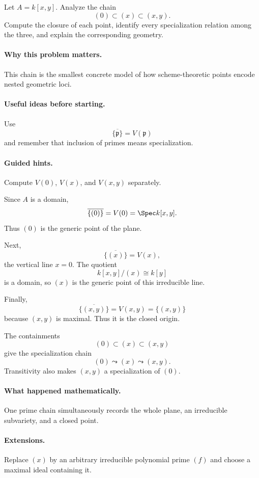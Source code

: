 \begin{problem}
Let $A=k[x,y]$.  Analyze the chain
\[
(0)\subset(x)\subset(x,y).
\]
Compute the closure of each point, identify every specialization relation among the three,
and explain the corresponding geometry.
\end{problem}

\paragraph{Why this problem matters.}
This chain is the smallest concrete model of how scheme-theoretic points encode nested
geometric loci.

\paragraph{Useful ideas before starting.}
Use
\[
\overline{\{\mathfrak p\}}=V(\mathfrak p)
\]
and remember that inclusion of primes means specialization.

\paragraph{Guided hints.}
Compute $V(0)$, $V(x)$, and $V(x,y)$ separately.

\begin{solution}
Since $A$ is a domain,
\[
\overline{\{(0)\}}=V(0)=\Spec k[x,y].
\]
Thus $(0)$ is the generic point of the plane.

Next,
\[
\overline{\{(x)\}}=V(x),
\]
the vertical line $x=0$.  The quotient
\[
k[x,y]/(x)\cong k[y]
\]
is a domain, so $(x)$ is the generic point of this irreducible line.

Finally,
\[
\overline{\{(x,y)\}}=V(x,y)=\{(x,y)\}
\]
because $(x,y)$ is maximal.  Thus it is the closed origin.

The containments
\[
(0)\subset(x)\subset(x,y)
\]
give the specialization chain
\[
(0)\leadsto(x)\leadsto(x,y).
\]
Transitivity also makes $(x,y)$ a specialization of $(0)$.
\end{solution}

\paragraph{What happened mathematically.}
One prime chain simultaneously records the whole plane, an irreducible subvariety, and a
closed point.

\paragraph{Extensions.}
Replace $(x)$ by an arbitrary irreducible polynomial prime $(f)$ and choose a maximal ideal
containing it.
